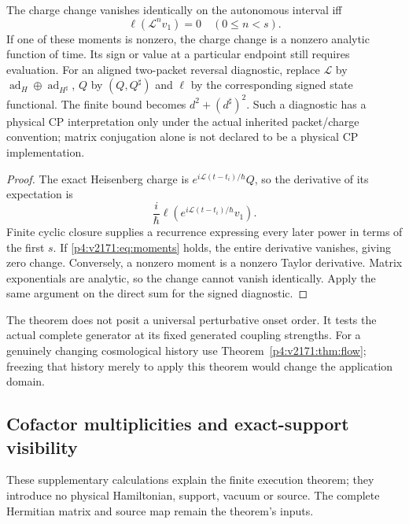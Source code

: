 \documentclass[12pt,a4paper]{article}
\begin{document}
\begin{theorem}\label{p4:v2171:thm:finite}
The charge change vanishes identically on the autonomous interval iff
\begin{equation}\label{p4:v2171:eq:moments}
 \ell(\mathcal L^nv_1)=0\quad(0\leq n<s).
\end{equation}
If one of these moments is nonzero, the charge change is a nonzero analytic
function of time. Its sign or value at a particular endpoint still requires
evaluation. For an aligned two-packet reversal diagnostic, replace
$\mathcal L$ by $\operatorname{ad}_H\oplus\operatorname{ad}_{H^\sharp}$, $Q$ by $(Q,Q^\sharp)$ and
$\ell$ by the corresponding signed state functional. The finite bound becomes
$d^2+(d^\sharp)^2$. Such a diagnostic has a physical CP interpretation only
under the actual inherited packet/charge convention; matrix conjugation
alone is not declared to be a physical CP implementation.
\end{theorem}
\begin{proof}
The exact Heisenberg charge is
$e^{i\mathcal L(t-t_i)/\hbar}Q$, so the derivative of its expectation is
\[
 \frac{i}{\hbar}\ell\left(
   e^{i\mathcal L(t-t_i)/\hbar}v_1\right).
\]
Finite cyclic closure supplies a recurrence expressing every later power
in terms of the first $s$. If \eqref{p4:v2171:eq:moments} holds, the entire
derivative vanishes, giving zero change. Conversely, a nonzero moment is a
nonzero Taylor derivative. Matrix exponentials are analytic, so the change
cannot vanish identically. Apply the same argument on the direct sum for
the signed diagnostic.
\end{proof}

The theorem does not posit a universal perturbative onset order. It tests
the actual complete generator at its fixed generated coupling strengths.
For a genuinely changing cosmological history use
Theorem~\ref{p4:v2171:thm:flow}; freezing that history merely to apply this theorem
would change the application domain.





\subsection{Cofactor multiplicities and exact-support visibility}
\label{p4:app:v2191-cofactor-checks}
These supplementary calculations explain the finite execution theorem;
they introduce no physical Hamiltonian, support, vacuum or source.
The complete Hermitian matrix and source map remain the theorem's inputs.
\end{document}
